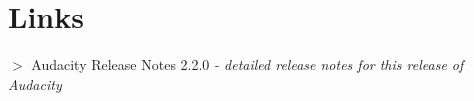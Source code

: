 \section{Links}


\textbf{\mbox{$>$}} Audacity Release Notes 2.2.0 \textit{- detailed release notes for this release of Audacity}%
% 
%  
% 
%  

																																																				

				
